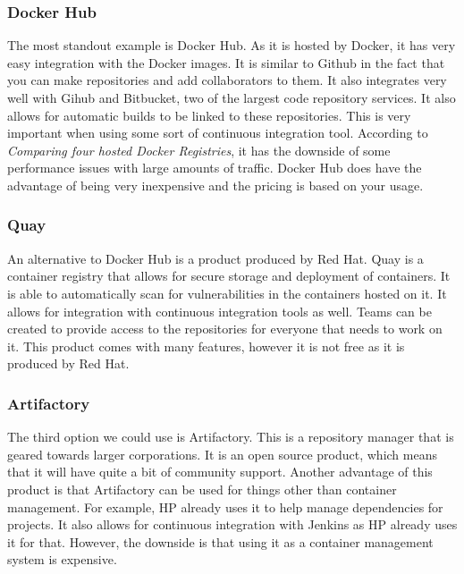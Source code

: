 \documentclass[onecolumn, draftclsnofoot,10pt, compsoc]{IEEEtran}
\begin{document}
\subsubsection{Docker Hub}
The most standout example is Docker Hub. As it is hosted by Docker, it has very easy integration with the Docker images. It is similar to Github in the fact that you can make repositories and add collaborators to them. It also integrates very well with Gihub and Bitbucket, two of the largest code repository services. It also allows for automatic builds to be linked to these repositories. This is very important when using some sort of continuous integration tool. According to \textit{Comparing four hosted Docker Registries}, it has the downside of some performance issues with large amounts of traffic.\cite{docker_hosting} Docker Hub does have the advantage of being very inexpensive and the pricing is based on your usage. 

\subsubsection{Quay}
An alternative to Docker Hub is a product produced by Red Hat. Quay is a container registry that allows for secure storage and deployment of containers. It is able to automatically scan for vulnerabilities in the containers hosted on it. It allows for integration with continuous integration tools as well. Teams can be created to provide access to the repositories for everyone that needs to work on it. This product comes with many features, however it is not free as it is produced by Red Hat.\cite{quay}

\subsubsection{Artifactory}

The third option we could use is Artifactory. This is a repository manager that is geared towards larger corporations. It is an open source product, which means that it will have quite a bit of community support. Another advantage of this product is that Artifactory can be used for things other than container management. For example, HP already uses it to help manage dependencies for projects. It also allows for continuous integration with Jenkins as HP already uses it for that. However, the downside is that using it as a container management system is expensive. \cite{docker_hosting}

\par
\end{document}
